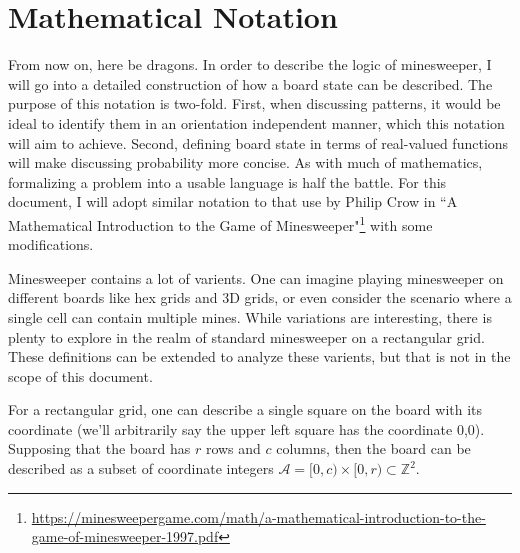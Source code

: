 \section{Mathematical Notation}
From now on, here be dragons. In order to describe the logic of minesweeper, I will go into a detailed construction of how a board state can be described. The purpose of this notation is two-fold. First, when discussing patterns, it would be ideal to identify them in an orientation independent manner, which this notation will aim to achieve. Second, defining board state in terms of real-valued functions will make discussing probability more concise. As with much of mathematics, formalizing a problem into a usable language is half the battle. For this document, I will adopt similar notation to that use by Philip Crow in ``A Mathematical Introduction to the
Game of Minesweeper"\footnote{\url{https://minesweepergame.com/math/a-mathematical-introduction-to-the-game-of-minesweeper-1997.pdf}} with some modifications.

Minesweeper contains a lot of varients. One can imagine playing minesweeper on different boards like hex grids and 3D grids, or even consider the scenario where a single cell can contain multiple mines. While variations are interesting, there is plenty to explore in the realm of standard minesweeper on a rectangular grid. These definitions can be extended to analyze these varients, but that is not in the scope of this document.

For a rectangular grid, one can describe a single square on the board with its coordinate (we'll arbitrarily say the upper left square has the coordinate 0,0). Supposing that the board has $r$ rows and $c$ columns, then the board can be described as a subset of coordinate integers $\mathcal{A}=[0,c)\times[0,r)\subset\mathbb{Z}^2$.



